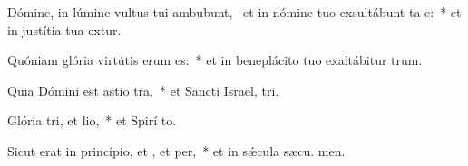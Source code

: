 \item Dómine, in lúmine vultus tui ambubunt,~\pscross{} et in nómine tuo exsultábunt ta e:~* et in justítia tua extur.
\item Quóniam glória virtútis erum  es:~* et in beneplácito tuo exaltábitur  trum.
\item Quia Dómini est astio tra,~* et Sancti Israël,  tri.
\item Glória tri, et lio,~* et Spirí to.
\item Sicut erat in princípio, et , et per,~* et in sǽcula sæcu. men.
